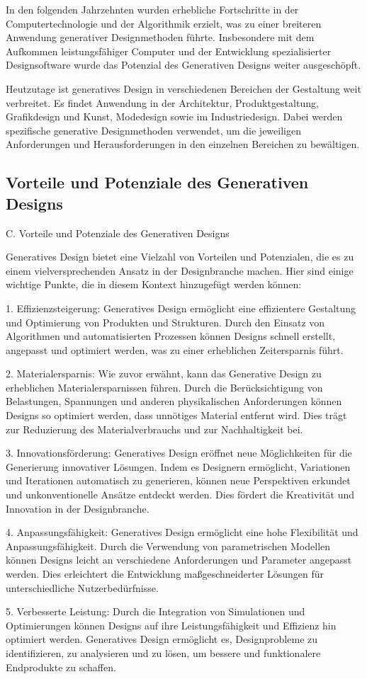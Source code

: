 In den folgenden Jahrzehnten wurden erhebliche Fortschritte in der Computertechnologie und der Algorithmik erzielt, was zu einer breiteren Anwendung generativer Designmethoden führte. Insbesondere mit dem Aufkommen leistungsfähiger Computer und der Entwicklung spezialisierter Designsoftware wurde das Potenzial des Generativen Designs weiter ausgeschöpft.

Heutzutage ist generatives Design in verschiedenen Bereichen der Gestaltung weit verbreitet. Es findet Anwendung in der Architektur, Produktgestaltung, Grafikdesign und Kunst, Modedesign sowie im Industriedesign. Dabei werden spezifische generative Designmethoden verwendet, um die jeweiligen Anforderungen und Herausforderungen in den einzelnen Bereichen zu bewältigen.

\subsection*{Vorteile und Potenziale des Generativen Designs}

C. Vorteile und Potenziale des Generativen Designs

Generatives Design bietet eine Vielzahl von Vorteilen und Potenzialen, die es zu einem vielversprechenden Ansatz in der Designbranche machen. Hier sind einige wichtige Punkte, die in diesem Kontext hinzugefügt werden können:

1. Effizienzsteigerung: Generatives Design ermöglicht eine effizientere Gestaltung und Optimierung von Produkten und Strukturen. Durch den Einsatz von Algorithmen und automatisierten Prozessen können Designs schnell erstellt, angepasst und optimiert werden, was zu einer erheblichen Zeitersparnis führt.

2. Materialersparnis: Wie zuvor erwähnt, kann das Generative Design zu erheblichen Materialersparnissen führen. Durch die Berücksichtigung von Belastungen, Spannungen und anderen physikalischen Anforderungen können Designs so optimiert werden, dass unnötiges Material entfernt wird. Dies trägt zur Reduzierung des Materialverbrauchs und zur Nachhaltigkeit bei.

3. Innovationsförderung: Generatives Design eröffnet neue Möglichkeiten für die Generierung innovativer Lösungen. Indem es Designern ermöglicht, Variationen und Iterationen automatisch zu generieren, können neue Perspektiven erkundet und unkonventionelle Ansätze entdeckt werden. Dies fördert die Kreativität und Innovation in der Designbranche.

4. Anpassungsfähigkeit: Generatives Design ermöglicht eine hohe Flexibilität und Anpassungsfähigkeit. Durch die Verwendung von parametrischen Modellen können Designs leicht an verschiedene Anforderungen und Parameter angepasst werden. Dies erleichtert die Entwicklung maßgeschneiderter Lösungen für unterschiedliche Nutzerbedürfnisse.

5. Verbesserte Leistung: Durch die Integration von Simulationen und Optimierungen können Designs auf ihre Leistungsfähigkeit und Effizienz hin optimiert werden. Generatives Design ermöglicht es, Designprobleme zu identifizieren, zu analysieren und zu lösen, um bessere und funktionalere Endprodukte zu schaffen.
